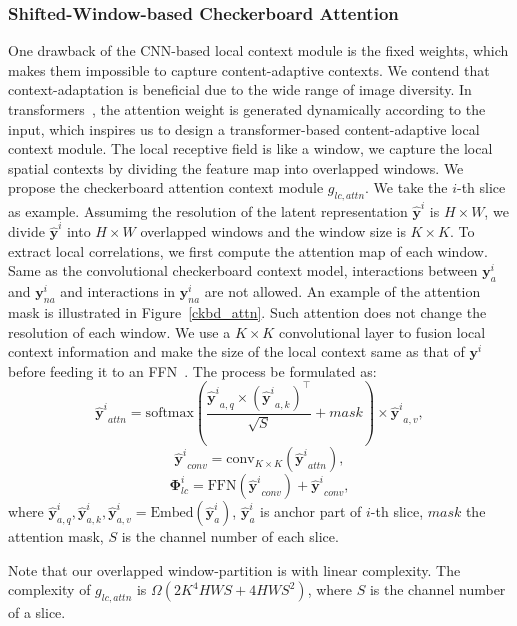 \documentclass[sigconf]{acmart}
\begin{document}
\subsubsection{Shifted-Window-based Checkerboard Attention}
One drawback of the CNN-based local context module is the fixed weights,
which makes them impossible to capture content-adaptive contexts.
We contend that context-adaptation is beneficial due to the wide range of image diversity.
In transformers~\cite{DBLP:conf/nips/VaswaniSPUJGKP17, DBLP:conf/iccv/LiuL00W0LG21},
the attention weight is generated dynamically according to the input,
which inspires us to design a transformer-based content-adaptive local context module.
The local receptive field is like a window,
we capture the local spatial contexts by dividing the feature map into overlapped windows.
We propose the checkerboard attention context module $g_{lc, attn}$.
We take the $i$-th slice as example.
Assumimg the resolution of the latent representation $\hat {\boldsymbol{y}}^i$ is $H \times W$,
we divide $\hat {\boldsymbol{y}}^i$
into $H \times W$ overlapped windows and the window size is $K\times K$.
To extract local correlations, we first compute the attention map of each window.
Same as the convolutional checkerboard context model, interactions between $\boldsymbol{y}_{a}^i$ and $\boldsymbol{y}_{na}^i$
and interactions in $\boldsymbol{y}_{na}^i$ are not allowed. An example of the attention mask is illustrated
in Figure~\ref{ckbd_attn}. Such attention does not change the resolution of each window.
We use a $K\times K$ convolutional layer to fusion local context information and
make the size of the local context same as that of $\boldsymbol{y}^i$ before feeding
it to an FFN~\cite{DBLP:conf/nips/VaswaniSPUJGKP17}. The process be formulated as:
\begin{equation}
    {{\hat {\boldsymbol{y}}}^i}_{attn} = \textrm{softmax}\left(\frac{{{\hat {\boldsymbol{y}}}^i}_{a,q} \times ({{\hat {\boldsymbol{y}}}^i}_{a,k})^\top}{\sqrt{S}} + mask\right) \times {{\hat {\boldsymbol{y}}}^i}_{a,v},
\end{equation}
\begin{equation}
    {{\hat {\boldsymbol{y}}}^i}_{conv} = \textrm{conv}_{K\times K}({{\hat {\boldsymbol{y}}}^i}_{attn}),
\end{equation}
\begin{equation}
    {\boldsymbol{\Phi}}^i_{lc} = \textrm{FFN}({{\hat {\boldsymbol{y}}}^i}_{conv}) + {{\hat {\boldsymbol{y}}}^i}_{conv},
\end{equation}
where $\hat {\boldsymbol{y}}^i_{a,q}, \hat {\boldsymbol{y}}^i_{a,k}, \hat {\boldsymbol{y}}^i_{a,v} = \textrm{Embed}(\hat {\boldsymbol{y}}^i_a)$,
$\hat {\boldsymbol{y}}^i_a$ is anchor part of $i$-th slice, $mask$ the attention mask,
$S$ is the channel number of each slice.\par
Note that our overlapped window-partition is with linear complexity.
The complexity of $g_{lc, attn}$ is $\Omega(2K^4HWS + 4HWS^2)$,
where $S$ is the channel number of a slice.
\end{document}
